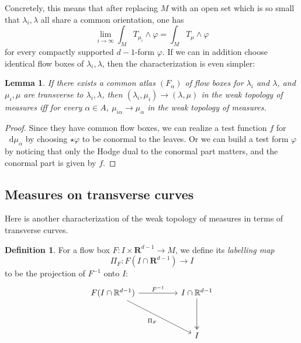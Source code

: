 \documentclass[reqno,10pt]{amsart}
\newcommand{\RR}{\mathbf{R}}
\newcommand*\dif{\mathop{}\!\mathrm{d}}
\newcommand{\dfn}[1]{\emph{#1}\index{#1}}
\newtheorem{lemma}[theorem]{Lemma}
\theoremstyle{definition}
\newtheorem{definition}[theorem]{Definition}
\numberwithin{equation}{section}
\begin{document}
Concretely, this means that after replacing $M$ with an open set which is so small that $\lambda_i, \lambda$ all share a common orientation, one has 
$$\lim_{i \to \infty} \int_M T_{\mu_i} \wedge \varphi = \int_M T_\mu \wedge \varphi$$
for every compactly supported $d-1$-form $\varphi$.
If we can in addition choose identical flow boxes of $\lambda_i, \lambda$, then the characterization is even simpler:

\begin{lemma}
If there exists a common atlas $(F_\alpha)$ of flow boxes for $\lambda_i$ and $\lambda$, and $\mu_i, \mu$ are transverse to $\lambda_i, \lambda$, then $(\lambda_i, \mu_i) \to (\lambda, \mu)$ in the weak topology of measures iff for every $\alpha \in A$, $\mu_{i\alpha} \to \mu_\alpha$ in the weak topology of measures.
\end{lemma}
\begin{proof}
Since they have common flow boxes, we can realize a test function $f$ for $\dif \mu_\alpha$ by choosing $\star \varphi$ to be conormal to the leaves.
Or we can build a test form $\varphi$ by noticing that only the Hodge dual to the conormal part matters, and the conormal part is given by $f$.
\end{proof}


\subsection{Measures on transverse curves}
Here is another characterization of the weak topology of measures in terms of transverse curves.

\begin{definition}
For a flow box $F: I \times \RR^{d - 1} \to M$, we define its \dfn{labelling map}
$$\Pi_F: F(I \cap \RR^{d - 1}) \to I$$
to be the projection of $F^{-1}$ onto $I$:
\[\begin{tikzcd}
	{F(I \cap \mathbb R^{d - 1})} && {I \cap \mathbb R^{d - 1}} \\
	\\
	&& I
	\arrow["{F^{-1}}", from=1-1, to=1-3]
	\arrow[two heads, from=1-3, to=3-3]
	\arrow["{\Pi_F}"', from=1-1, to=3-3]
\end{tikzcd}\]
\end{definition}
\end{document}
